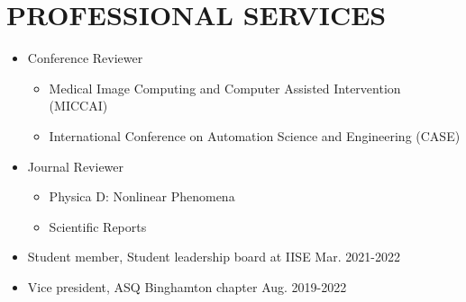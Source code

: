 \documentclass[10pt]{article}
\begin{document}
\section*{\bf PROFESSIONAL SERVICES}
\begin{itemize}	
		\item Conference Reviewer
		\begin{itemize}[label=$\bullet$]
			\item Medical Image Computing and Computer Assisted Intervention (MICCAI)
			\item International Conference on Automation Science and Engineering (CASE)
		\end{itemize}
        \item Journal Reviewer 
        \begin{itemize}[label=$\bullet$]
            \item Physica D: Nonlinear Phenomena
            \item Scientific Reports
        \end{itemize}
        
	\item Student member, Student leadership board at IISE
	\hfill{Mar. 2021-2022}
	\item Vice president, ASQ Binghamton chapter
	\hfill{Aug. 2019-2022}
\end{itemize}

\end{document}
